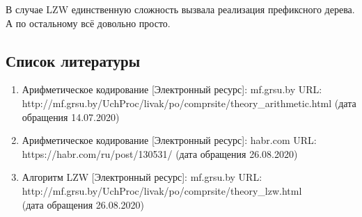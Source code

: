 \documentclass[12pt]{article}
\begin{document}
В случае LZW единственную сложность вызвала реализация префиксного дерева. А по остальному всё довольно просто.

\subsection*{Список литературы}
\begin{enumerate}
	\item Арифметическое кодирование [Электронный ресурс]: mf.grsu.by URL:\\ http://mf.grsu.by/UchProc/livak/po/comprsite/theory\_arithmetic.html (дата обращения 14.07.2020)
	\item Арифметическое кодирование [Электронный ресурс]: habr.com URL:\\ https://habr.com/ru/post/130531/ (дата обращения 26.08.2020)
	\item Алгоритм LZW [Электронный ресурс]: mf.grsu.by URL:\\ http://mf.grsu.by/UchProc/livak/po/comprsite/theory\_lzw.html \\(дата обращения 26.08.2020)
\end{enumerate}
\end{document}
